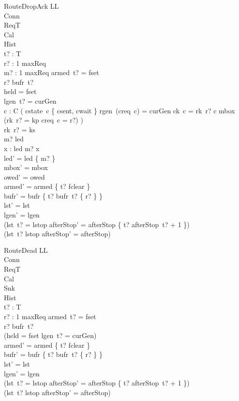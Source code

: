 \documentclass[a4paper,10pt,fleqn]{article}
\begin{document}
\begin{schema}{RouteDropAck}
  \Delta LL \\
  \Xi Conn \\
  \Xi ReqT \\
  \Xi Cal \\
  \Xi Hist \\
  t? : T \\
  r? : 1 \upto maxReq \\
  m? : 1 \upto maxReq
\where
  armed~t? = fset \\
  r? \in bufr~t? \\
  held = fset \\
  lgen~t? = curGen \\
  \forall c : C \spot \lnot ( cstate~c \in \{ csent, cwait \}
    \land rgen~(creq~c) = curGen \land ck~c = rk~r? \land c \notin \dom mbox
    \land (rk~r? = kp \implies creq~c = r?)
    ) \\
  rk~r? = ks \\
  m? \in led \\
  \forall x : led \spot m? \leq x \\
  led' = led \setminus \{ m? \} \\
  mbox' = mbox \\
  owed' = owed \\
  armed' = armed \oplus \{ t? \mapsto fclear \} \\
  bufr' = bufr \oplus \{ t? \mapsto bufr~t? \setminus \{ r? \} \} \\
  lst' = lst \\
  lgen' = lgen \\
  (lst~t? = lstop \implies
    afterStop' = afterStop \oplus \{ t? \mapsto afterStop~t? + 1 \}) \\
  (lst~t? \neq lstop \implies afterStop' = afterStop)
\end{schema}

\begin{schema}{RouteDead}
  \Delta LL \\
  \Xi Conn \\
  \Xi ReqT \\
  \Xi Cal \\
  \Xi Snk \\
  \Xi Hist \\
  t? : T \\
  r? : 1 \upto maxReq
\where
  armed~t? = fset \\
  r? \in bufr~t? \\
  \lnot (held = fset \land lgen~t? = curGen) \\
  armed' = armed \oplus \{ t? \mapsto fclear \} \\
  bufr' = bufr \oplus \{ t? \mapsto bufr~t? \setminus \{ r? \} \} \\
  lst' = lst \\
  lgen' = lgen \\
  (lst~t? = lstop \implies
    afterStop' = afterStop \oplus \{ t? \mapsto afterStop~t? + 1 \}) \\
  (lst~t? \neq lstop \implies afterStop' = afterStop)
\end{schema}
\end{document}
